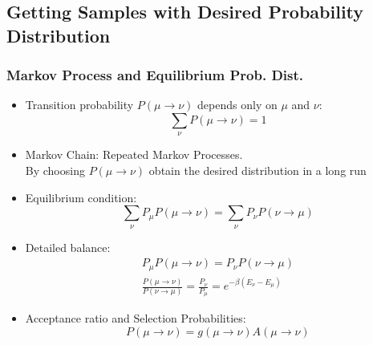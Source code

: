 \documentclass[10pt, notes]{beamer}
\begin{document}
\subsection{Getting Samples with Desired Probability Distribution}
\begin{frame}
\frametitle{Markov Process and Equilibrium Prob. Dist.}

\begin{itemize}
\item Transition probability $P(\mu \rightarrow \nu)$ depends only on $\mu$ and $\nu$: 
\begin{equation}
\sum\limits_{\nu} P(\mu \rightarrow \nu) =1
\end{equation}
\item Markov Chain: Repeated Markov Processes.  \\
By choosing $P(\mu \rightarrow \nu)$ obtain the desired distribution in a long run 
\item \small Equilibrium condition: 
\begin{equation}
\sum\limits_{\nu} P_\mu P(\mu \rightarrow \nu) = \sum\limits_{\nu} P_\nu P(\nu \rightarrow \mu)  
\end{equation}
\item \small Detailed balance: 
\begin{gather}
 P_\mu P(\mu \rightarrow \nu) = P_\nu P(\nu \rightarrow \mu) \\
\frac{P(\mu \rightarrow \nu)}{P(\nu \rightarrow \mu)} = \frac{P_\nu }{P_\mu } = e^ {-\beta (E_\nu - E_\mu)}
\end{gather}
\item \small Acceptance ratio and Selection Probabilities: 
\begin{equation}
P(\mu \rightarrow \nu) = g(\mu \rightarrow \nu) A(\mu \rightarrow \nu)
\end{equation}

\end{itemize}

\end{frame}
\end{document}
